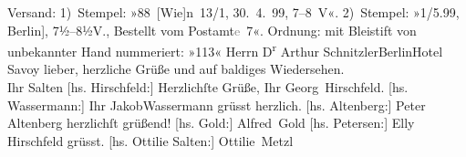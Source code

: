 \begin{ledgroupsized}[t]{13cm}
{\newline{}Versand: 1) Stempel: »\nobreak{}88 {[}Wie{]}n 13/1, 30. 4. 99, 7–8 V\nobreak{}«.   2) Stempel: »\nobreak{}1/5.99, \oindex{Berlin@\textbf{Berlin}|pwk}{[}Berlin{]}, 7½–8½V., Bestellt vom Postamt\textcolor{gray}{e} 7\nobreak{}«. 
\newline{}Ordnung: mit Bleistift von unbekannter Hand nummeriert: »113« }\pstart{}{\pb}Herrn D\textsuperscript{r} Arthur Schnitzler\pend{}\pstart{}Berlin\pend{}\pstart{}Hotel Savoy\pend{}{\bigskip}\pstart
           \noindent{}{\pb}lieber, herzliche Grüße und auf baldiges Wiedersehen.
               {\\}Ihr \spacefill\mbox{Salten}\pend
           \pstart
           {[}hs. Hirschfeld:{]} Herzlichſte Grüße, Ihr \spacefill\mbox{Georg
                  Hirschfeld.}\pend
           \pstart
           {[}hs. Wassermann:{]} Ihr JakobWassermann grüsst herzlich.\pend
           \pstart
           {[}hs. Altenberg:{]} Peter Altenberg herzlichſt grüßend!\pend
           \pstart
           {[}hs. Gold:{]} \spacefill\mbox{Alfred Gold}\pend
           \pstart
           {[}hs. Petersen:{]} Elly Hirschfeld grüsst.\pend
           \pstart
           {[}hs. Ottilie Salten:{]} \spacefill\mbox{Ottilie Metzl}\pend
           
         
         \endnumbering{}\end{ledgroupsized}  \newcommand{\dateiname}{L03289}\newcommand{\titel}{Felix Salten an Arthur Schnitzler, 30. 4. 1899}\newcommand{\editorInnen}{Martin Anton Müller und Laura Untner}
      